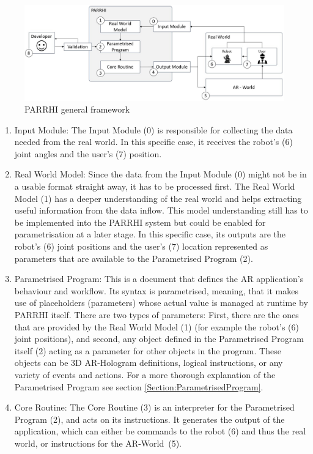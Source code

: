 \begin{figure}[h]
	\centering
	\includegraphics[width=1\textwidth]{Figures/PARRHIConcept03.jpg}
	\caption{PARRHI general framework}
	\label{Fig:PARRHIConcept}
\end{figure}

\begin{enumerate}
	\addtocounter{enumi}{-1}
	\setlength\itemsep{-1em}
	\item Input Module: The Input Module (0) is responsible for collecting the data needed from the real world. In this specific case, it receives the robot’s (6) joint angles and the user’s (7) position.
	\item Real World Model: Since the data from the Input Module (0) might not be in a usable format straight away, it has to be processed first. The Real World Model (1) has a deeper understanding of the real world and helps extracting useful information from the data inflow. This model understanding still has to be implemented into the PARRHI system but could be enabled for parametrisation at a later stage. In this specific case, its outputs are the robot’s (6) joint positions and the user’s (7) location represented as parameters that are available to the Parametrised Program (2).
	\item Parametrised Program: This is a document that defines the AR application’s behaviour and workflow. Its syntax is parametrised, meaning, that it makes use of placeholders (parameters) whose actual value is managed at runtime by PARRHI itself. There are two types of parameters: First, there are the ones that are provided by the Real World Model (1) (for example the robot’s (6) joint positions), and second, any object defined in the Parametrised Program itself (2) acting as a parameter for other objects in the program. These objects can be 3D AR-Hologram definitions, logical instructions, or any variety of events and actions. For a more thorough explanation of the Parametrised Program see section \ref{Section:ParametrisedProgram}.
	\item Core Routine: The Core Routine (3) is an interpreter for the Parametrised Program (2), and acts on its instructions. It generates the output of the application, which can either be commands to the robot (6) and thus the real world, or instructions for the AR-World~(5).

\end{enumerate}
